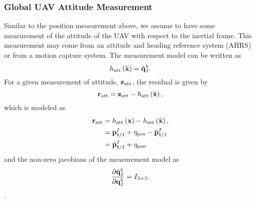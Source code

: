 \subsubsection{Global UAV Attitude Measurement}
Similar to the position measurement above, we assume to have some measurement of
the attitude of the UAV with respect to the inertial frame. This measurement may
come from an attitude and heading reference system (AHRS) or from a motion
capture system. 
The measurement model can
be written as
\begin{equation}
  h_{\text{att}} \left( \hat{\boldsymbol{\mathrm{x}}} \right) = \hat{\boldsymbol{\mathrm{q}}}_{I}^b.
\end{equation}
For a given measurement of attitude, $\boldsymbol{\mathrm{z}}_{\text{att}}$, the residual is
given by
\begin{equation*}
  \boldsymbol{\mathrm{r}}_{\text{att}} = \boldsymbol{\mathrm{z}}_{\text{att}} - h_{\text{att}} \left( \hat{\boldsymbol{\mathrm{x}}}
    \right),
\end{equation*}
which is modeled as
\begin{align*}
  \boldsymbol{\mathrm{r}}_{\text{att}} &=  h_{\text{att}} \left( \boldsymbol{\mathrm{x}} \right) - h_{\text{att}} \left( \hat{\boldsymbol{\mathrm{x}}}
  \right), \\
                        &= \boldsymbol{\mathrm{p}}_{b/I}^I + \eta_{\text{pos}} -
                        \hat{\boldsymbol{\mathrm{p}}}_{b/I}^I \\
                        &= \tilde{\boldsymbol{\mathrm{p}}}_{b/I}^I + \eta_{\text{pos}}.
\end{align*}
and the non-zero jacobians of the measurement model as
\begin{equation}
  \frac{\partial \hat{\boldsymbol{\mathrm{q}}}_{I}^b}{\partial \boldsymbol{\mathrm{q}}_{I}^b} = I_{3
  \times 3}.
\end{equation}
.

